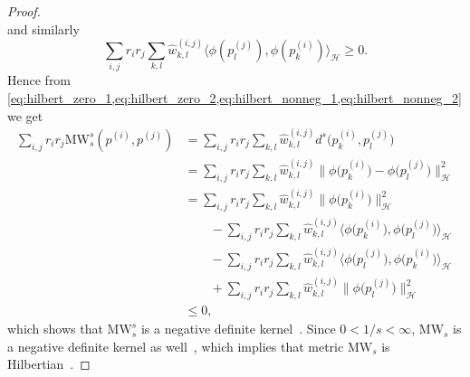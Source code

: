 \documentclass{article}
\begin{document}
\begin{proof}
\begin{equation}
    \end{equation}
    and similarly
    \begin{equation}\label{eq:hilbert_nonneg_2}
        \sum_{i,j} r_i r_j \sum_{k,l} \hat{w}^{(i,j)}_{k,l} \Big\langle \phi(p^{(j)}_l), \phi(p^{(i)}_k) \Big\rangle_\mathcal{H} \geq 0.
    \end{equation}
    Hence from \cref{eq:hilbert_zero_1,eq:hilbert_zero_2,eq:hilbert_nonneg_1,eq:hilbert_nonneg_2} we get
    \begin{equation*}
        \begin{split}
            \sum_{i,j} r_i r_j \mathrm{MW}_s^s(p^{(i)}, p^{(j)}) &= \sum_{i,j} r_i r_j \sum_{k,l} \hat{w}^{(i,j)}_{k,l} d^s\Big(p^{(i)}_k, p^{(j)}_l\Big) \\
            &= \sum_{i,j} r_i r_j \sum_{k,l} \hat{w}^{(i,j)}_{k,l} \Big\|\phi\Big(p^{(i)}_k\Big) - \phi\Big(p^{(j)}_l\Big)\Big\|_{\mathcal{H}}^2 \\
            &=  \sum_{i,j} r_i r_j \sum_{k,l} \hat{w}^{(i,j)}_{k,l} \Big\|\phi\Big(p^{(i)}_k\Big)\Big\|_\mathcal{H}^2 \\
            &\qquad -  \sum_{i,j} r_i r_j \sum_{k,l} \hat{w}^{(i,j)}_{k,l} \Big\langle \phi\Big(p^{(i)}_k\Big), \phi\Big(p^{(j)}_l\Big) \Big\rangle_\mathcal{H} \\
            &\qquad - \sum_{i,j} r_i r_j \sum_{k,l} \hat{w}^{(i,j)}_{k,l} \Big\langle \phi\Big(p^{(j)}_l\Big), \phi\Big(p^{(i)}_k\Big) \Big\rangle_\mathcal{H} \\
            &\qquad + \sum_{i,j} r_i r_j \sum_{k,l} \hat{w}^{(i,j)}_{k,l} \Big\|\phi\Big(p^{(j)}_l\Big)\Big\|_\mathcal{H}^2 \\
            &\leq 0,
        \end{split}
    \end{equation*}
    which shows that $\mathrm{MW}_s^s$ is a negative definite
    kernel~\citep[Definition~3.1.1]{Berg1984}. Since $0 < 1/s < \infty$,
    $\mathrm{MW}_s$ is a negative definite kernel as well~\citep[Corollary~3.2.10]{Berg1984},
    which implies that metric $\mathrm{MW}_s$ is Hilbertian~\citep[Proposition~3.3.2]{Berg1984}.
\end{proof}
\end{document}
